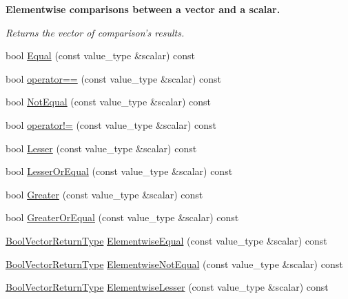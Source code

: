 \begin{Indent}{\bf Elementwise comparisons between a vector and a scalar.}\par
{\em Returns the vector of comparison's results. }\begin{DoxyCompactItemize}
\item 
bool \hyperlink{classvct_dynamic_const_vector_base_ac8b0f957120f2f1cc9c7b524131b8bd1}{Equal} (const value\-\_\-type \&scalar) const 
\item 
bool \hyperlink{classvct_dynamic_const_vector_base_a5241f9f0ad4ee0158d7b8b33f643beb6}{operator==} (const value\-\_\-type \&scalar) const 
\item 
bool \hyperlink{classvct_dynamic_const_vector_base_a87242599727de04e86e0cab3b7f99f68}{Not\-Equal} (const value\-\_\-type \&scalar) const 
\item 
bool \hyperlink{classvct_dynamic_const_vector_base_a32cf8400517b9b1376b60c8313873608}{operator!=} (const value\-\_\-type \&scalar) const 
\item 
bool \hyperlink{classvct_dynamic_const_vector_base_a0dc70a75143298d523e407481b7e22cc}{Lesser} (const value\-\_\-type \&scalar) const 
\item 
bool \hyperlink{classvct_dynamic_const_vector_base_a1c4d6046f27b7bfbf53e8d1825be5814}{Lesser\-Or\-Equal} (const value\-\_\-type \&scalar) const 
\item 
bool \hyperlink{classvct_dynamic_const_vector_base_acad20818e109f3c102803b7fa2b77349}{Greater} (const value\-\_\-type \&scalar) const 
\item 
bool \hyperlink{classvct_dynamic_const_vector_base_a4f03432ee3713b320ca738b292ed64f3}{Greater\-Or\-Equal} (const value\-\_\-type \&scalar) const 
\item 
\hyperlink{classvct_dynamic_const_vector_base_a2de5b9c0f8c70782c548808d3ae4a453}{Bool\-Vector\-Return\-Type} \hyperlink{classvct_dynamic_const_vector_base_aad58b5892f6b58aaaa2b6d245ca246eb}{Elementwise\-Equal} (const value\-\_\-type \&scalar) const 
\item 
\hyperlink{classvct_dynamic_const_vector_base_a2de5b9c0f8c70782c548808d3ae4a453}{Bool\-Vector\-Return\-Type} \hyperlink{classvct_dynamic_const_vector_base_a635d7c0124f86065ec6f446b11a46d02}{Elementwise\-Not\-Equal} (const value\-\_\-type \&scalar) const 
\item 
\hyperlink{classvct_dynamic_const_vector_base_a2de5b9c0f8c70782c548808d3ae4a453}{Bool\-Vector\-Return\-Type} \hyperlink{classvct_dynamic_const_vector_base_a9dd0f9765e8dff24d297a45b086ed915}{Elementwise\-Lesser} (const value\-\_\-type \&scalar) const 

\end{DoxyCompactItemize}
\end{Indent}
